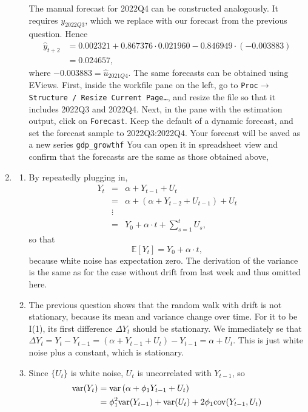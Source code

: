 \documentclass[11pt, a4paper]{article}
\newcommand{\E}{\ensuremath{{\mathbb E}}} %
\def\func#1{\mathop{\rm #1}}
\begin{document}
\begin{enumerate}
\begin{enumerate}
The manual forecast for 2022Q4 can be constructed analogously. It requires $y_{2022Q3}$, which we replace with our forecast from the previous question. Hence
\begin{align*}
\widehat{y}_{t+2}&= 0.002321+0.867376\cdot 0.021960-0.846949\cdot(-0.003883)\\
&=0.024657,
\end{align*}
where $-0.003883=\hat{u}_{2021Q4}$.
The same forecasts can be obtained using EViews. First, inside the workfile pane on the left, go to \texttt{Proc}$\rightarrow$\linebreak\texttt{Structure / Resize Current Page\ldots}, and resize the file so that it includes 2022Q3 and 2022Q4. Next, in the pane with the estimation output, click on \texttt{Forecast}. Keep the default of a dynamic forecast, and set the forecast sample to 2022Q3:2022Q4. Your forecast will be saved as a new series \verb.gdp_growthf. You can open it in spreadsheet view and confirm that the forecasts are the same as those obtained above,
\end{enumerate}
\item
\begin{enumerate}
\item By repeatedly plugging in,
\begin{eqnarray*}
Y_t&=&\alpha+Y_{t-1}+U_t\\
   &=&\alpha+(\alpha +Y_{t-2}+U_{t-1})+U_t\\
  &\vdots&\\
&=&Y_0+\alpha\cdot t+\sum_{s=1}^t U_s,
\end{eqnarray*}
so that
\[
\E[Y_t]=Y_0+ \alpha\cdot t,
\]
because white noise has expectation zero. The derivation of the variance is the same as for the case without drift from last week and thus omitted here.
\item The previous question shows that the random walk with drift is not stationary, because its mean and variance change over time. For it to be I(1), its first difference $\Delta Y_t$ should be stationary.
We immediately se that $\Delta Y_t=Y_t-Y_{t-1}=(\alpha+Y_{t-1}+U_t)-Y_{t-1}=\alpha + U_t$. This is just white noise plus a constant, which is stationary.
\item
Since $\{U_t\}$ is white noise, $U_t$  is uncorrelated with $Y_{t-1}$, so
\begin{align*}
\mathrm{var}(Y_t) &= \func{var}\left(\alpha+\phi_1Y_{t-1}+U_{t}\right)\\
&= \phi_1^2 \mathrm{var}(Y_{t-1}) + \mathrm{var}(U_t) + 2
\phi_1 \mathrm{cov}(Y_{t-1},U_{t})

\end{align*}
\end{enumerate}
\end{enumerate}
\end{document}
